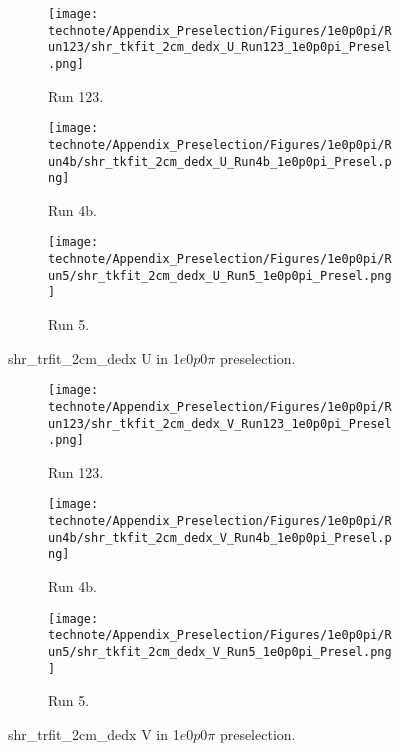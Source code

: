 \begin{figure}[H]
    \centering
    \begin{subfigure}[t]{0.32\linewidth}
        \texttt{[image: technote/Appendix\_Preselection/Figures/1e0p0pi/Run123/shr\_tkfit\_2cm\_dedx\_U\_Run123\_1e0p0pi\_Presel.png]}
        \caption{Run 123.}
    \end{subfigure}%
    \hspace{0.2cm}%
    \begin{subfigure}[t]{0.32\linewidth}
        \texttt{[image: technote/Appendix\_Preselection/Figures/1e0p0pi/Run4b/shr\_tkfit\_2cm\_dedx\_U\_Run4b\_1e0p0pi\_Presel.png]}
        \caption{Run 4b.}
    \end{subfigure}%
    \hspace{0.2cm}%
    \begin{subfigure}[t]{0.32\linewidth}
        \texttt{[image: technote/Appendix\_Preselection/Figures/1e0p0pi/Run5/shr\_tkfit\_2cm\_dedx\_U\_Run5\_1e0p0pi\_Presel.png]}
        \caption{Run 5.}
    \end{subfigure}
    \caption{shr\_trfit\_2cm\_dedx U in 1$e$0$p$0$\pi$ preselection.}
\end{figure}

\begin{figure}[H]
    \centering
    \begin{subfigure}[t]{0.32\linewidth}
        \texttt{[image: technote/Appendix\_Preselection/Figures/1e0p0pi/Run123/shr\_tkfit\_2cm\_dedx\_V\_Run123\_1e0p0pi\_Presel.png]}
        \caption{Run 123.}
    \end{subfigure}%
    \hspace{0.2cm}%
    \begin{subfigure}[t]{0.32\linewidth}
        \texttt{[image: technote/Appendix\_Preselection/Figures/1e0p0pi/Run4b/shr\_tkfit\_2cm\_dedx\_V\_Run4b\_1e0p0pi\_Presel.png]}
        \caption{Run 4b.}
    \end{subfigure}%
    \hspace{0.2cm}%
    \begin{subfigure}[t]{0.32\linewidth}
        \texttt{[image: technote/Appendix\_Preselection/Figures/1e0p0pi/Run5/shr\_tkfit\_2cm\_dedx\_V\_Run5\_1e0p0pi\_Presel.png]}
        \caption{Run 5.}
    \end{subfigure}
    \caption{shr\_trfit\_2cm\_dedx V in 1$e$0$p$0$\pi$ preselection.}
\end{figure}

